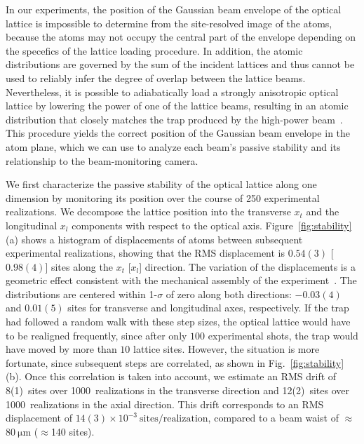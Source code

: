 \documentclass[twocolumn,aps,pra,showpacs,preprintnumbers,bibnotes]{revtex4-1}
\newcommand\unit[2]{\ensuremath{#1~\mathrm{{#2}}}}
\begin{document}
In our experiments, the position of the Gaussian beam envelope of the optical lattice is impossible to determine from the site-resolved image of the atoms, because the atoms may not occupy the central part of the envelope depending on the specefics of the lattice loading procedure.
In addition, the atomic distributions are governed by the sum of the incident lattices and thus cannot be used to reliably infer the degree of overlap between the lattice beams.
Nevertheless, it is possible to adiabatically load a strongly anisotropic optical lattice by lowering the power of one of the lattice beams, resulting in an atomic distribution that closely matches the trap produced by the high-power beam~\cite{Parsons2015}.
This procedure yields the correct position of the Gaussian beam envelope in the atom plane, which we can use to analyze each beam's passive stability and its relationship to the beam-monitoring camera.

We first characterize the passive stability of the optical lattice along one dimension by monitoring its position over the course of 250 experimental realizations.
We decompose the lattice position into the transverse $x_t$ and the longitudinal $x_l$ components with respect to the optical axis.
Figure~\ref{fig:stability}(a) shows a histogram of displacements of atoms between subsequent experimental realizations, showing that the RMS displacement is $0.54(3)$ [$0.98(4)$] sites along the $x_t$ [$x_l$] direction.
The variation of the displacements is a geometric effect consistent with the mechanical assembly of the experiment~\cite{Huber2014}.
The distributions are centered within 1-$\sigma$ of zero along both directions: $-0.03(4)$ and $0.01(5)$ sites for transverse and longitudinal axes, respectively.
If the trap had followed a random walk with these step sizes, the optical lattice would have to be realigned frequently, since after only $100$ experimental shots, the trap would have moved by more than $10$ lattice sites.
However, the situation is more fortunate, since subsequent steps are correlated, as shown in Fig.~\ref{fig:stability}(b).
Once this correlation is taken into account, we estimate an RMS drift of 8(1)~sites over 1000~realizations in the transverse direction and 12(2)~sites over 1000~realizations in the axial direction.
This drift corresponds to an RMS displacement of $\unit{14(3)\times 10^{-3}}{sites / realization}$, compared to a beam waist of $\approx$\unit{80}{\mu{}m} ($\approx$140 sites).
\end{document}
